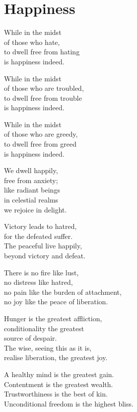 
\chapter{Happiness}


While in the midst\\
of those who hate,\\
to dwell free from hating\\
is happiness indeed.


While in the midst\\
of those who are troubled,\\
to dwell free from trouble\\
is happiness indeed.


While in the midst\\
of those who are greedy,\\
to dwell free from greed\\
is happiness indeed.


We dwell happily,\\
free from anxiety;\\
like radiant beings\\
in celestial realms\\
we rejoice in delight.


Victory leads to hatred,\\
for the defeated suffer.\\
The peaceful live happily,\\
beyond victory and defeat.


There is no fire like lust,\\
no distress like hatred,\\
no pain like the burden of attachment,\\
no joy like the peace of liberation.


Hunger is the greatest affliction,\\
conditionality the greatest\\
source of despair.\\
The wise, seeing this as it is,\\
realise liberation, the greatest joy.


A healthy mind is the greatest gain.\\
Contentment is the greatest wealth.\\
Trustworthiness is the best of kin.\\
Unconditional freedom is the highest bliss.


